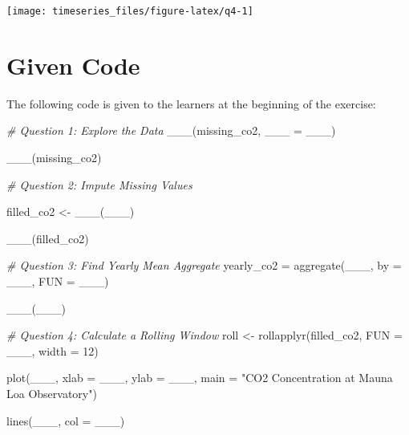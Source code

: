 \documentclass[
]{book}
\newenvironment{Shaded}{\begin{snugshade}}{\end{snugshade}}
\newcommand{\AttributeTok}[1]{\textcolor[rgb]{0.77,0.63,0.00}{#1}}
\newcommand{\CommentTok}[1]{\textcolor[rgb]{0.56,0.35,0.01}{\textit{#1}}}
\newcommand{\DecValTok}[1]{\textcolor[rgb]{0.00,0.00,0.81}{#1}}
\newcommand{\FunctionTok}[1]{\textcolor[rgb]{0.00,0.00,0.00}{#1}}
\newcommand{\NormalTok}[1]{#1}
\newcommand{\OtherTok}[1]{\textcolor[rgb]{0.56,0.35,0.01}{#1}}
\newcommand{\StringTok}[1]{\textcolor[rgb]{0.31,0.60,0.02}{#1}}
\begin{document}
\begin{center}\texttt{[image: timeseries\_files/figure-latex/q4-1]} \end{center}

\newpage

\hypertarget{given-code}{%
\section{Given Code}\label{given-code}}

The following code is given to the learners at the beginning of the exercise:

\begin{Shaded}
\begin{Highlighting}[]
\CommentTok{\# Question 1: Explore the Data}
\FunctionTok{\_\_\_}\NormalTok{(missing\_co2, }\AttributeTok{\_\_\_ =}\NormalTok{ \_\_\_)}

\FunctionTok{\_\_\_}\NormalTok{(missing\_co2)}
\end{Highlighting}
\end{Shaded}

\begin{Shaded}
\begin{Highlighting}[]
\CommentTok{\# Question 2: Impute Missing Values}

\NormalTok{filled\_co2 }\OtherTok{\textless{}{-}} \FunctionTok{\_\_\_}\NormalTok{(\_\_\_)}

\FunctionTok{\_\_\_}\NormalTok{(filled\_co2)}
\end{Highlighting}
\end{Shaded}

\begin{Shaded}
\begin{Highlighting}[]
\CommentTok{\# Question 3: Find Yearly Mean Aggregate}
\NormalTok{yearly\_co2 }\OtherTok{=} \FunctionTok{aggregate}\NormalTok{(\_\_\_, }\AttributeTok{by =}\NormalTok{ \_\_\_, }\AttributeTok{FUN =}\NormalTok{ \_\_\_)}

\FunctionTok{\_\_\_}\NormalTok{(\_\_\_)}
\end{Highlighting}
\end{Shaded}

\begin{Shaded}
\begin{Highlighting}[]
\CommentTok{\# Question 4: Calculate a Rolling Window}
\NormalTok{roll }\OtherTok{\textless{}{-}} \FunctionTok{rollapplyr}\NormalTok{(filled\_co2, }\AttributeTok{FUN =}\NormalTok{ \_\_\_, }\AttributeTok{width =} \DecValTok{12}\NormalTok{)}

\FunctionTok{plot}\NormalTok{(\_\_\_,}
     \AttributeTok{xlab =}\NormalTok{ \_\_\_,}
     \AttributeTok{ylab =}\NormalTok{ \_\_\_,}
     \AttributeTok{main =} \StringTok{"CO2 Concentration at Mauna Loa Observatory"}\NormalTok{)}

\FunctionTok{lines}\NormalTok{(\_\_\_, }\AttributeTok{col =}\NormalTok{ \_\_\_)}
\end{Highlighting}
\end{Shaded}


  
\end{document}

